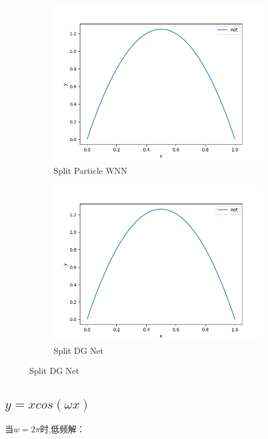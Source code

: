 \begin{figure}[H]
    \begin{subfigure}{0.5\textwidth}  
        \centering  
        \includegraphics[width=0.9\linewidth]{./pics/final/possion/dgnet1d/splitpwnn2.png}  
        \caption{Split Particle WNN}  
    \end{subfigure}%
    \begin{subfigure}{0.5\textwidth}  
        \centering  
        \includegraphics[width=0.9\linewidth]{./pics/final/possion/dgnet1d/dgnet2.png}  
        \caption{Split DG Net}
    \end{subfigure} 
\end{figure} 

\subsection*{$y = xcos(\omega x)$}
当$w=2\pi$时,低频解：

